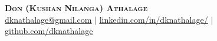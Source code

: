 \begin{center}
    \textbf{\Huge \scshape Don (Kushan Nilanga) Athalage} \\ \vspace{1pt}
    \href{mailto:dknathalage@gmail.com}{\underline{dknathalage@gmail.com}} $|$ 
    \href{https://www.linkedin.com/in/dknathalage/}{\underline{linkedin.com/in/dknathalage/}} $|$
    \href{https://github.com/dknathalage}{\underline{github.com/dknathalage}}
\end{center}